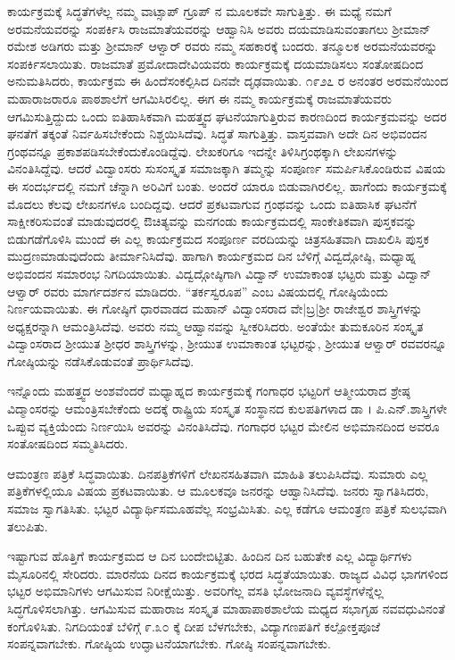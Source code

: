 {ಕಾರ್ಯಕ್ರಮಕ್ಕೆ ಸಿದ್ಧತೆಗಳೆಲ್ಲ ನಮ್ಮ ವಾಟ್ಸಾಪ್ ಗ್ರೂಪ್ ನ ಮೂಲಕವೇ ಸಾಗುತ್ತಿತ್ತು. ಈ ಮಧ್ಯೆ ನಮಗೆ ಅರಮನೆಯವರನ್ನು ಸಂಪರ್ಕಿಸಿ ರಾಜಮಾತೆಯವರನ್ನು ಆಹ್ವಾನಿಸಿ ಅವರು ದಯಮಾಡಿಸುವಂತಾಗಲು ಶ್ರೀಮಾನ್ ರಮೇಶ ಅಡಿಗರು ಮತ್ತು ಶ್ರೀಮಾನ್ ಆಳ್ವಾರ್ ರವರು ನಮ್ಮ ಸಹಕಾರಕ್ಕೆ ಬಂದರು. ತನ್ಮೂಲಕ ಅರಮನೆಯವರನ್ನು ಸಂಪರ್ಕಿಸಲಾಯಿತು. ರಾಜಮಾತೆ ಪ್ರಮೋದಾದೇವಿಯವರು ಕಾರ್ಯಕ್ರಮಕ್ಕೆ ದಯಮಾಡಿಸಲು ಸಂತೋಷದಿಂದ ಅನುಮತಿಸಿದರು, ಕಾರ್ಯಕ್ರಮ ಈ ಹಿಂದೆ\break ಸಂಕಲ್ಪಿಸಿದ ದಿನವೇ ದೃಢವಾಯಿತು. ೧೯೨೭ ರ ಅನಂತರ ಅರಮನೆಯಿಂದ ಮಹಾರಾಜರಾರೂ ಪಾಠಶಾಲೆಗೆ ಆಗಮಿಸಿರಲಿಲ್ಲ. ಈಗ ಈ ನಮ್ಮ ಕಾರ್ಯಕ್ರಮಕ್ಕೆ ರಾಜಮಾತೆಯವರು ಆಗಮಿಸುತ್ತಿದ್ದುದು ಒಂದು ಐತಿಹಾಸಿಕವಾಗಿ ಮಹತ್ತ್ವದ ಘಟನೆ\-ಯಾಗುತ್ತಿರುವ ಕಾರಣದಿಂದ ಕಾರ್ಯಕ್ರಮವನ್ನು ಅದರ ಘನತೆಗೆ ತಕ್ಕಂತೆ ನಿರ್ವಹಿಸಬೇಕೆಂದು ನಿಶ್ಚಯಿಸಿದೆವು. ಸಿದ್ಧತೆ ಸಾಗುತ್ತಿತ್ತು. ವಾಸ್ತವವಾಗಿ ಅದೇ ದಿನ ಅಭಿವಂದನ ಗ್ರಂಥವನ್ನೂ ಪ್ರಕಾಶಪಡಿಸಬೇಕೆಂದುಕೊಂಡಿದ್ದೆವು. ಲೇಖಕರಿಗೂ ಇದನ್ನೇ ತಿಳಿಸಿ\break ಗ್ರಂಥಕ್ಕಾಗಿ ಲೇಖನಗಳನ್ನು ವಿನಂತಿಸಿದ್ದೆವು. ಆದರೆ ವಿದ್ವಾಂಸರು ಸುಸಂಸ್ಕೃತ ಸಮಾಜ\-ಕ್ಕಾಗಿ ತಮ್ಮನ್ನು ಸಂಪೂರ್ಣ ಸಮರ್ಪಿಸಿಕೊಂಡಿರುವ ವಿಷಯ ಈ ಸಂದರ್ಭದಲ್ಲಿ ನಮಗೆ ಚೆನ್ನಾಗಿ ಅರಿವಿಗೆ ಬಂತು. ಅಂದರೆ ಯಾರೂ ಬಿಡುವಾಗಿರಲಿಲ್ಲ. ಹಾಗೆಂದು ಕಾರ್ಯಕ್ರಮಕ್ಕೆ ಮೊದಲು ಕೆಲವು ಲೇಖನಗಳೂ ಬಂದಿದ್ದವು. ಆದರೆ ಪ್ರಕಟವಾಗುವ ಗ್ರಂಥವನ್ನು ಒಂದು ಐತಿಹಾಸಿಕ ಘಟನೆಗೆ ಸಾಕ್ಷೀಕರಿಸುವಂತೆ ಮಾಡುವುದರಲ್ಲಿ  ಔಚಿತ್ಯವನ್ನು ಮನಗಂಡು ಕಾರ್ಯಕ್ರಮದಲ್ಲಿ ಸಾಂಕೇತಿಕವಾಗಿ ಪುಸ್ತಕವನ್ನು ಬಿಡುಗಡೆಗೊಳಿಸಿ ಮುಂದೆ ಈ ಎಲ್ಲ ಕಾರ್ಯಕ್ರಮದ ಸಂಪೂರ್ಣ ವರದಿಯನ್ನು ಚಿತ್ರಸಹಿತವಾಗಿ ದಾಖಲಿಸಿ ಪುಸ್ತಕ ಮುದ್ರಣಮಾಡುವುದೆಂದು ತೀರ್ಮಾನಿಸಿದೆವು. ಹಾಗಾಗಿ ಕಾರ್ಯಕ್ರಮದ ದಿನ ಬೆಳಿಗ್ಗೆ ವಿದ್ವದ್ಗೋಷ್ಠಿ, ಮಧ್ಯಾಹ್ನ ಅಭಿವಂದನ ಸಮಾರಂಭ ನಿಗದಿಯಾಯಿತು. ವಿದ್ವದ್ಗೋಷ್ಠಿಗಾಗಿ ವಿದ್ವಾನ್ ಉಮಾಕಾಂತ ಭಟ್ಟರು ಮತ್ತು ವಿದ್ವಾನ್ ಆಳ್ವಾರ್ ರವರು ಮಾರ್ಗದರ್ಶನ ಮಾಡಿದರು. “ತರ್ಕಸ್ವರೂಪ” ಎಂಬ ವಿಷಯದಲ್ಲಿ ಗೋಷ್ಠಿಯೆಂದು ನಿರ್ಣಯವಾಯಿತು. ಈ ಗೋಷ್ಠಿಗೆ ಧಾರವಾಡದ ಮಹಾನ್ ವಿದ್ವಾಂಸರಾದ ವೇ|ಬ್ರ|ಶ್ರೀ ರಾಜೇಶ್ವರ ಶಾಸ್ತ್ರಿಗಳನ್ನು ಅಧ್ಯಕ್ಷರನ್ನಾಗಿ ಆಮಂತ್ರಿಸಿದೆವು. ಅವರು ನಮ್ಮ ಆಹ್ವಾನವನ್ನು ಸ್ವೀಕರಿಸಿದರು. ಅಂತೆಯೇ ತುಮಕೂರಿನ ಸಂಸ್ಕೃತ ವಿದ್ವಾಂಸರಾದ ಶ್ರೀಯುತ ಶ್ರೀಧರ ಶಾಸ್ತ್ರಿಗಳನ್ನು,  ಶ್ರೀಯುತ ಉಮಾಕಾಂತ ಭಟ್ಟರನ್ನು, ಶ್ರೀಯುತ ಆಳ್ವಾರ್ ರವವರನ್ನೂ ಗೋಷ್ಠಿಯನ್ನು ನಡೆಸಿಕೊಡುವಂತೆ ಪ್ರಾರ್ಥಿಸಿದೆವು. 
\vskip 8pt

ಇನ್ನೊಂದು ಮಹತ್ತ್ವದ ಅಂಶವೆಂದರೆ ಮಧ್ಯಾಹ್ನದ ಕಾರ್ಯಕ್ರಮಕ್ಕೆ ಗಂಗಾಧರ ಭಟ್ಟರಿಗೆ ಆತ್ಮೀಯರಾದ ಶ್ರೇಷ್ಠ ವಿದ್ಮಾಂಸರನ್ನು ಆಮಂತ್ರಿಸಬೇಕೆಂದು ಅದಕ್ಕೆ ರಾಷ್ಟ್ರಿಯ ಸಂಸ್ಕೃತ ಸಂಸ್ಥಾನದ ಕುಲಪತಿಗಳಾದ ಡಾ । ಪಿ.ಎನ್.ಶಾಸ್ತ್ರಿಗಳೇ ಒಪ್ಪುವ ವ್ಯಕ್ತಿಯೆಂದು ನಿರ್ಣಯಿಸಿ ಅವರನ್ನು ವಿನಂತಿಸಿದೆವು. ಗಂಗಾಧರ ಭಟ್ಟರ ಮೇಲಿನ ಅಭಿಮಾನದಿಂದ ಅವರೂ ಸಂತೋಷದಿಂದ ಸಮ್ಮತಿಸಿದರು. 

ಆಮಂತ್ರಣ ಪತ್ರಿಕೆ ಸಿದ್ಧವಾಯಿತು. ದಿನಪತ್ರಿಕೆಗಳಿಗೆ ಲೇಖನಸಹಿತವಾಗಿ ಮಾಹಿತಿ ತಲುಪಿಸಿದೆವು. ಸುಮಾರು ಎಲ್ಲ ಪತ್ರಿಕೆಗಳಲ್ಲಿಯೂ ವಿಷಯ ಪ್ರಕಟವಾಯಿತು. ಆ ಮೂಲಕವೂ ಜನರನ್ನು ಆಹ್ವಾನಿಸಿದೆವು. ಜನರು ಸ್ವಾಗತಿಸಿದರು, ಸಮಾಜ \hbox{ಸ್ವಾಗತಿಸಿತು}. ಭಟ್ಟರ ವಿದ್ಯಾರ್ಥಿಸಮೂಹವೆಲ್ಲ ಸಂಭ್ರಮಿಸಿತು. ಎಲ್ಲ ಕಡೆಗೂ ಆಮಂತ್ರಣ ಪತ್ರಿಕೆ ಸುಲಭವಾಗಿ ತಲುಪಿತು.  

ಇಷ್ಟಾಗುವ ಹೊತ್ತಿಗೆ ಕಾರ್ಯಕ್ರಮದ ಆ ದಿನ ಬಂದೇಬಿಟ್ಟಿತು. ಹಿಂದಿನ ದಿನ ಬಹುತೇಕ ಎಲ್ಲ ವಿದ್ಯಾರ್ಥಿಗಳು ಮೈಸೂರಿನಲ್ಲಿ ಸೇರಿದರು. ಮಾರನೆಯ ದಿನದ ಕಾರ್ಯಕ್ರಮಕ್ಕೆ ಭರದ ಸಿದ್ಧತೆಯಾಯಿತು. ರಾಜ್ಯದ ವಿವಿಧ ಭಾಗಗಳಿಂದ ಭಟ್ಟರ ಅಭಿಮಾನಿಗಳು ಆಗಮಿಸುವ ನಿರೀಕ್ಷೆಯಿತ್ತು. ಅವರಿಗೆಲ್ಲ ವಸತಿ ಭೋಜನಾದಿ ವ್ಯವಸ್ಥೆ\-ಗಳೆನ್ನೆಲ್ಲ ಸಿದ್ಧಗೊಳಿಸಲಾಗಿತ್ತು. ಆಗಮಿಸುವ ಮಹಾರಾಜ ಸಂಸ್ಕೃತ ಮಾಹಾಪಾಠ\-ಶಾಲೆಯ ಮಧ್ಯದ ಸಭಾಗೃಹ ನವವಧುವಿನಂತೆ ಕಂಗೊಳಿಸಿತು. ನಿಗದಿಯಂತೆ ಬೆಳಿಗ್ಗೆ ೯.೩೦ ಕ್ಕೆ ದೀಪ ಬೆಳಗಬೇಕು, ವಿದ್ಯಾಗಣಪತಿಗೆ ಕಲ್ಪೋಕ್ತಪೂಜೆ ಸಂಪನ್ನವಾಗಬೇಕು. ಗೋಷ್ಠಿಯ ಉದ್ಘಾಟನೆಯಾಗಬೇಕು. ಗೋಷ್ಠಿ ಸಂಪನ್ನವಾಗಬೇಕು.

}
